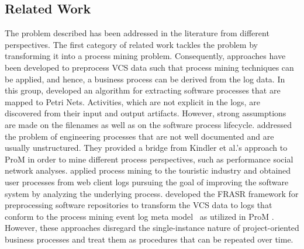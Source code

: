 

\subsection{Related Work}\label{sec:bpm2015:related}

The problem described has been addressed in the literature from different perspectives. The first category of related work tackles the problem by transforming it into a process mining problem. Consequently, approaches have been developed to preprocess VCS data such that process mining techniques can be applied, and hence, a business process can be derived from the log data.
In this group, \cite{DBLP:conf/se/KindlerRS06,kindler2006incremental} developed an algorithm for extracting software processes that are mapped to Petri Nets. Activities, which are not explicit in the logs, are discovered from their input and output artifacts. However, strong assumptions are made on the filenames as well as on the software process lifecycle. %
\cite{rubin2007process} addressed the problem of engineering processes that are not well documented and are usually unstructured. They provided a bridge from Kindler et al.'s approach to ProM \citep{van2005prom} in order to mine different process perspectives, such as performance social network analyses. %
\cite{rubin2014agile} applied process mining to the touristic industry and obtained user processes from web client logs pursuing the goal of improving the software system by analyzing the underlying process.
\cite{DBLP:conf/csmr/PoncinSB11} developed the FRASR framework for preprocessing software repositories to transform the VCS data to logs that conform to the process mining event log meta model~\cite{van2005meta} as utilized in ProM \citep{van2005prom}.
However, these approaches disregard the single-instance nature of project-oriented business processes and treat them as procedures that can be repeated over time.

